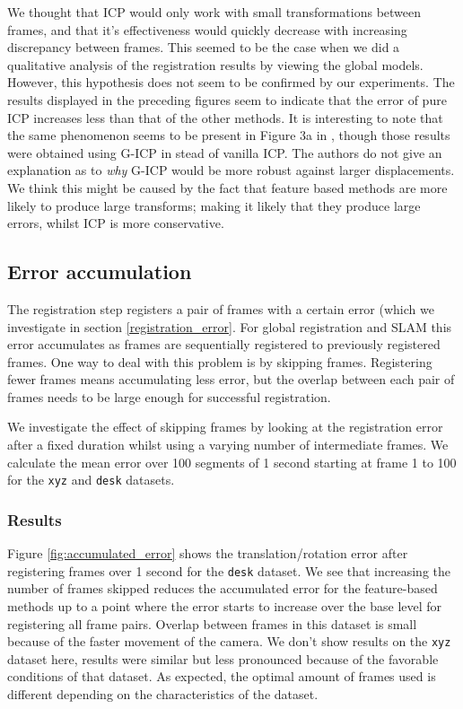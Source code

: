 \documentclass[a4paper]{article}
\begin{document}
We thought that \ac{ICP} would only work with small transformations between frames, and that it's effectiveness would quickly decrease with increasing discrepancy between frames. This seemed to be the case when we did a qualitative analysis of the registration results by viewing the global models. However, this hypothesis does not seem to be confirmed by our experiments. The results displayed in the preceding figures seem to indicate that the error of pure \ac{ICP} increases less than that of the other methods. It is interesting to note that the same phenomenon seems to be present in Figure 3a in \cite{steinbruecker_sturm_cremers_iccv11}, though those results were obtained using G-ICP in stead of vanilla \ac{ICP}. The authors do not give an explanation as to \emph{why} G-ICP would be more robust against larger displacements. We think this might be caused by the fact that feature based methods are more likely to produce large transforms; making it likely that they produce large errors, whilst \ac{ICP} is more conservative.

\subsection{Error accumulation}
\label{accumulated_error}

The registration step registers a pair of frames with a certain error (which we investigate in section \ref{registration_error}. For global registration and \ac{SLAM} this error accumulates as frames are sequentially registered to previously registered frames. One way to deal with this problem is by skipping frames. Registering fewer frames means accumulating less error, but the overlap between each pair of frames needs to be large enough for successful registration. 

We investigate the effect of skipping frames by looking at the registration error after a fixed duration whilst using a varying number of intermediate frames. We calculate the mean error over 100 segments of 1 second starting at frame 1 to 100 for the \texttt{xyz} and \texttt{desk} datasets.

\subsubsection{Results}

Figure \ref{fig:accumulated_error} shows the translation/rotation error after registering frames over 1 second for the \texttt{desk} dataset. We see that increasing the number of frames skipped reduces the accumulated error for the feature-based methods up to a point where the error starts to increase over the base level for registering all frame pairs. Overlap between frames in this dataset is small because of the faster movement of the camera.  We don't show results on the \texttt{xyz} dataset here, results were similar but less pronounced because of the favorable conditions of that dataset. As expected, the optimal amount of frames used is different depending on the characteristics of the dataset.
\end{document}
